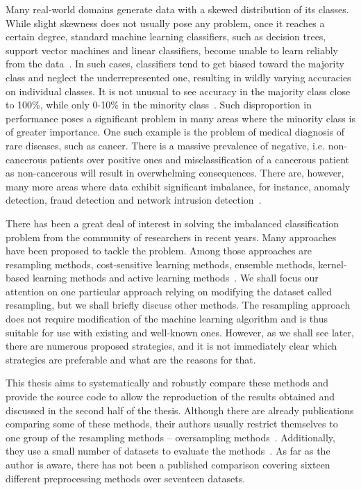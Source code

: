 
Many real-world domains generate data with a skewed distribution of its classes. While slight
skewness does not usually pose any problem, once it reaches a certain degree, standard machine
learning classifiers, such as decision trees, support vector machines and linear classifiers,
become unable to learn reliably from the data~\cite{learning-from-imb-data}. In such cases,
classifiers tend to get biased toward the majority class and neglect the underrepresented one,
resulting in wildly varying accuracies on individual classes. It is not unusual to see accuracy in
the majority class close to 100\%, while only 0-10\% in the minority
class~\cite{learning-from-imb-data}. Such disproportion in performance poses a significant problem
in many areas where the minority class is of greater importance. One such example is the problem of
medical diagnosis of rare diseases, such as cancer. There is a massive prevalence of negative, i.e.
non-cancerous patients over positive ones and misclassification of a cancerous patient as
non-cancerous will result in overwhelming consequences. There are, however, many more areas where
data exhibit significant imbalance, for instance, anomaly detection, fraud detection and network
intrusion detection~\cite{gosain2017}.

There has been a great deal of interest in solving the imbalanced classification problem from the
community of researchers in recent years. Many approaches have been proposed to tackle the problem.
Among those approaches are resampling methods, cost-sensitive learning methods, ensemble methods,
kernel-based learning methods and active learning methods~\cite{learning-from-imb-data,
gosain2017}. We shall focus our attention on one particular approach relying on modifying the
dataset called resampling, but we shall briefly discuss other methods. The resampling approach does
not require modification of the machine learning algorithm and is thus suitable for use with
existing and well-known ones. However, as we shall see later, there are numerous proposed
strategies, and it is not immediately clear which strategies are preferable and what are the
reasons for that.

This thesis aims to systematically and robustly compare these methods and provide the source code
to allow the reproduction of the results obtained and discussed in the second half of the thesis.
Although there are already publications comparing some of these methods, their authors usually
restrict themselves to one group of the resampling methods – oversampling methods~\cite{gosain2017,
amin2016}. Additionally, they use a small number of datasets to evaluate the
methods~\cite{gosain2017, amin2016, barandela2004}. As far as the author is aware, there has not
been a published comparison covering sixteen different preprocessing methods over seventeen
datasets.

